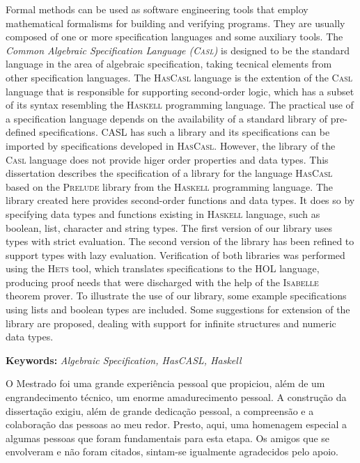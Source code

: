 \documentclass[12pt,twoside]{report} %
\newcommand{\HasCASL}{\textsc{HasCasl}\xspace}
\newcommand{\CASL}{\textsc{Casl}\xspace}
\newcommand{\Hets}{\textsc{Hets}\xspace}
\newcommand{\Haskell}{\textsc{Haskell}\xspace}
\newcommand{\HOL}{\textsc{HOL}\xspace}
\newcommand{\Isabelle}{\textsc{Isabelle}\xspace}
\newcommand{\Prelude}{\textsc{Prelude}\xspace}
\begin{document}
Formal methods can be used as software engineering tools that employ mathematical formalisms for building and verifying  programs.
They are usually composed of one or more specification languages and some auxiliary tools. 
The \textit{Common Algebraic Specification Language (\CASL)} is designed to be the standard language in the area of algebraic specification, taking tecnical elements from other specification languages. 
The \HasCASL language is the extention of the \CASL language that is responsible for supporting second-order logic, which has a subset of its syntax resembling the \Haskell programming language.
The practical use of a specification language depends on the availability of a standard library of pre-defined specifications. 
CASL has such a library and its specifications can be imported by specifications developed in \HasCASL. 
However, the library of the \CASL language does not provide higer order properties and data types. 
This dissertation describes the specification of a library for the language \HasCASL based on the \Prelude library from the \Haskell programming language. 
The library created here provides second-order functions and data types.
It does so by specifying data types and functions existing in \Haskell language, such as boolean, list, character and string types. 
The first version of our library uses types with strict evaluation. 
The second version of the library has been refined to support types with lazy evaluation. 
Verification of both libraries was performed using the \Hets tool, which translates specifications to the \HOL language, producing proof needs that were discharged  with the help of the \Isabelle theorem prover. 
To illustrate the use of our library, some example specifications using lists and boolean types are included.
Some suggestions for extension of the library are proposed, dealing with support for infinite structures and numeric data types.

\textbf{Keywords:} \textit{Algebraic Specification, HasCASL, Haskell}

O Mestrado foi uma grande experiência pessoal que propiciou, além de um engrandecimento técnico, um enorme amadurecimento pessoal.
A construção da dissertação exigiu, além de grande dedicação pessoal, a compreensão e a colaboração das pessoas ao meu redor.
Presto, aqui, uma homenagem especial a algumas pessoas que foram fundamentais para esta etapa.
Os amigos que se envolveram e não foram citados, sintam-se igualmente agradecidos pelo apoio.
\end{document}
